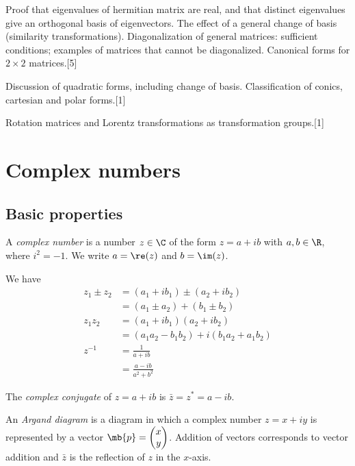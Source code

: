 \documentclass[a4paper]{article}
\begin{document}
{\vspace{5pt}
\noindent Proof that eigenvalues of hermitian matrix are real, and that distinct eigenvalues give an orthogonal basis of eigenvectors. The effect of a general change of basis (similarity transformations). Diagonalization of general matrices: sufficient conditions; examples of matrices that cannot be diagonalized. Canonical forms for $2 \times 2$ matrices.\hspace*{\fill}[5]

\vspace{5pt}
\noindent Discussion of quadratic forms, including change of basis. Classification of conics, cartesian and polar forms.\hspace*{\fill}[1]

\vspace{5pt}
\noindent Rotation matrices and Lorentz transformations as transformation groups.\hspace*{\fill}[1]}

\tableofcontents

\section{Complex numbers}
\subsection{Basic properties}
\begin{defi}
  A \emph{complex number} is a number $z\in \C$ of the form $z = a + ib$ with $a, b\in \R$, where $i^2=-1$. We write $a = \re(z)$ and $b = \im(z)$.
\end{defi}

We have
\begin{align*}
  z_1\pm z_2 &= (a_1 + ib_1)\pm (a_2 + ib_2)\\
  &= (a_1\pm a_2) + (b_1 \pm b_2)\\
  z_1z_2 &= (a_1 + ib_1)(a_2 + ib_2)\\
  &= (a_1a_2 - b_1b_2) + i(b_1a_2 + a_1b_2)\\
  z^{-1} &= \frac{1}{a + ib}\\
  &= \frac{a - ib}{a^2 + b^2}
\end{align*}
\begin{defi}
  The \emph{complex conjugate} of $z = a+ ib$ is $\bar{z} = z^* = a - ib$.
\end{defi}

\begin{defi}
  An \emph{Argand diagram} is a diagram in which a complex number $z = x + iy$ is represented by a vector $\mb{p}=\begin{pmatrix}x\\y\end{pmatrix}$. Addition of vectors corresponds to vector addition and $\bar{z}$ is the reflection of $z$ in the $x$-axis.
\end{defi}
\end{document}
